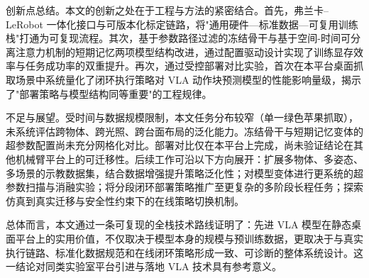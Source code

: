 \begin{conclusion}
创新点总结。本文的创新之处在于工程与方法的紧密结合。首先，弗兰卡--LeRobot 一体化接口与可版本化标定链路，将"通用硬件—标准数据—可复用训练栈"打通为可复现流程。其次，基于参数路径过滤的冻结骨干与基于空间-时间可分离注意力机制的短期记忆两项模型结构改进，通过配置驱动设计实现了训练显存效率与任务成功率的双重提升。再次，通过受控部署对比实验，首次在本平台桌面抓取场景中系统量化了闭环执行策略对 VLA 动作块预测模型的性能影响量级，揭示了"部署策略与模型结构同等重要"的工程规律。

不足与展望。受时间与数据规模限制，本文任务分布较窄（单一绿色苹果抓取），未系统评估跨物体、跨光照、跨台面布局的泛化能力。冻结骨干与短期记忆变体的超参数配置尚未充分网格化对比。部署对比仅在本平台上完成，尚未验证结论在其他机械臂平台上的可迁移性。后续工作可沿以下方向展开：扩展多物体、多姿态、多场景的示教数据集，结合数据增强提升策略泛化性；对模型变体进行更系统的超参数扫描与消融实验；将分段闭环部署策略推广至更复杂的多阶段长程任务；探索仿真到真实迁移与安全性约束下的在线策略切换机制。

总体而言，本文通过一条可复现的全栈技术路线证明了：先进 VLA 模型在静态桌面平台上的实用价值，不仅取决于模型本身的规模与预训练数据，更取决于与真实执行链路、标准化数据规范和在线闭环策略形成一致、可诊断的整体系统设计。这一结论对同类实验室平台引进与落地 VLA 技术具有参考意义。
\end{conclusion}
